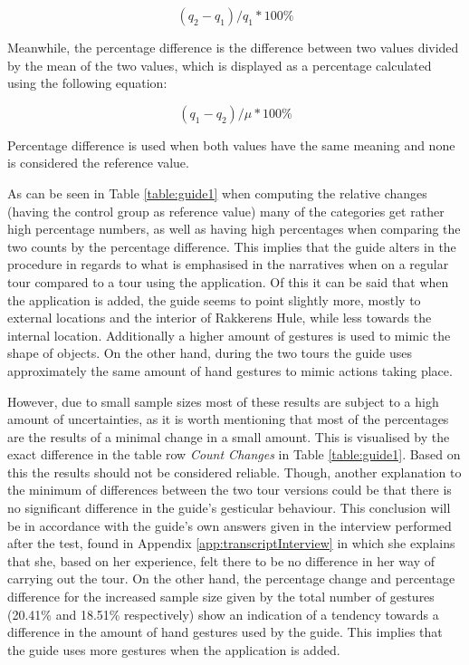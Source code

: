 \begin{equation}
(q_2 - q_1)/q_1 * 100\% 
\end{equation}

Meanwhile, the percentage difference is the difference between two values divided by the mean of the two values, which is displayed as a percentage calculated using the following equation:

\begin{equation}\label{eq:perdif}
(q_1 -q_2)/\mu * 100\%
\end{equation}

Percentage difference is used when both values have the same meaning and none is considered the reference value.

As can be seen in Table \ref{table:guide1} when computing the relative changes (having the control group as reference value) many of the categories get rather high percentage numbers, as well as having high percentages when comparing the two counts by the percentage difference. This implies that the guide alters in the procedure in regards to what is emphasised in the narratives when on a regular tour compared to a tour using the application. Of this it can be said that when the application is added, the guide seems to point slightly more, mostly to external locations and the interior of Rakkerens Hule, while less towards the internal location.  Additionally a higher amount of gestures is used to mimic the shape of objects. On the other hand, during the two tours the guide uses approximately the same amount of hand gestures to mimic actions taking place.

However, due to small sample sizes most of these results are subject to a high amount of uncertainties, as it is worth mentioning that most of the percentages are the results of a minimal change in a small amount. This is visualised by the exact difference in the table row \textit{Count Changes} in Table \ref{table:guide1}. Based on this the results should not be considered reliable. Though, another explanation to the minimum of differences between the two tour versions could be that there is no significant difference in the guide’s gesticular behaviour. This conclusion will be in accordance with the guide’s own answers given in the interview performed after the test, found in Appendix \ref{app:transcriptInterview} in which she explains that she, based on her experience, felt there to be no difference in her way of carrying out the tour.  On the other hand, the percentage change and percentage difference for the increased sample size given by the total number of gestures (20.41\% and 18.51\% respectively) show an indication of a tendency towards a difference in the amount of hand gestures used by the guide. This implies that the guide uses more gestures when the application is added. 

